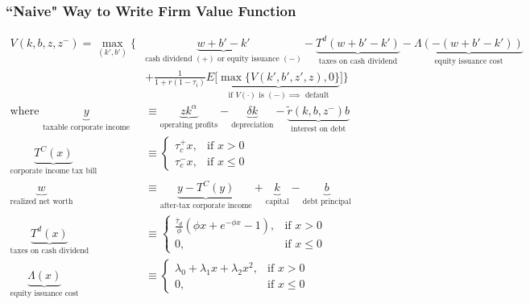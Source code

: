 \documentclass[usenames,dvipsnames, handout]{beamer}
\begin{document}
\begin{frame}
\frametitle{``Naive" Way to Write Firm Value Function}
\scriptsize
\begin{align*}
V(k, b, z, z^-) =
\max_{(k', b')} \Bigg\{ 
& \underbrace{w + b' - k'}_{\text{cash dividend } (+) \text{ or equity issuance } (-)} - \underbrace{T^d(w + b' - k')}_{\text{taxes on cash dividend}} - \underbrace{\Lambda(-(w + b' - k'))}_{\text{equity issuance cost}} \\
&+ \frac{1}{1+r(1-\tau_i)} E\Big[\underbrace{\max\{ V(k', b', z', z), 0\}}_{\text{if }V(\cdot) \text{ is } (-) \implies\text{ default}}\Big] \Bigg\} \\
\text{where }
\underbrace{y}_{\text{taxable corporate income}} &\equiv \underbrace{z k^\alpha}_{\text{operating profits}} - \underbrace{\delta k}_{\text{depreciation}} - \underbrace{\tilde r(k, b, z^-) b}_{\text{interest on debt}} \\
\underbrace{T^C(x)}_{\text{corporate income tax bill}} &\equiv 
\begin{cases} 
\tau_c^+ x, & \text{if }x > 0 \\
\tau_c^- x, & \text{if }x \le 0
\end{cases}\\
\underbrace{w}_{\text{realized net worth}} &\equiv \underbrace{y - T^C(y)}_{\text{after-tax corporate income}}+ \underbrace{k}_{\text{capital}}  - \underbrace{b}_{\text{debt principal}} \\
\underbrace{T^d(x)}_{\text{taxes on cash dividend}} &\equiv 
\begin{cases}
\frac{\bar \tau_d}{\phi}(\phi x + e^{-\phi x} - 1), & \text{if }x > 0 \\
0,& \text{if } x \le 0
\end{cases} \\
\underbrace{\Lambda(x)}_{\text{equity issuance cost}} &\equiv 
\begin{cases} 
\lambda_0 + \lambda_1 x + \lambda_2 x^2, & \text{if }x > 0 \\
0, & \text{if }x \le 0
\end{cases}
\end{align*}
\end{frame}
\end{document}
